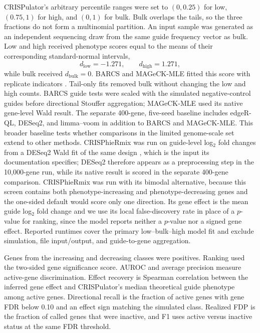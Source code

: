 CRISPulator's arbitrary percentile ranges were set to $(0,0.25)$ for low,
$(0.75,1)$ for high, and $(0,1)$ for bulk.  Bulk overlaps the tails, so the
three fractions do not form a multinomial partition.  An input sample was
generated as an independent sequencing draw from the same guide frequency
vector as bulk.  Low and high received phenotype scores equal to the means of
their corresponding standard-normal intervals, \[
d_{\mathrm{low}}=-1.271,\qquad  d_{\mathrm{high}}=1.271, \] while bulk
received $d_{\mathrm{bulk}}=0$.  BARCS and MAGeCK-MLE fitted this score with
replicate indicators \citep{li2015mageckvispr}. Tail-only fits removed bulk
without changing the low and high counts.  BARCS guide tests were scaled with
the simulated negative-control guides before directional Stouffer aggregation;
MAGeCK-MLE used its native gene-level Wald result.  The separate 400-gene,
five-seed baseline includes edgeR-QL, DESeq2, and limma--voom in addition to
BARCS and MAGeCK-MLE.  This broader baseline tests whether comparisons in the
limited genome-scale set extend to other methods. CRISPhieRmix
\citep{daley2018crisphiermix} was run on guide-level log$_2$ fold changes from
a DESeq2 Wald fit of the same design \citep{love2014deseq2}, which is the
input its documentation specifies; DESeq2 therefore appears as a preprocessing
step in the 10,000-gene run, while its native result is scored in the separate
400-gene comparison. CRISPhieRmix was run with its bimodal alternative,
because this screen contains both phenotype-increasing and
phenotype-decreasing genes and the one-sided default would score only one
direction.  Its gene effect is the mean guide log$_2$ fold change and we use
its local false-discovery rate in place of a $p$-value for ranking, since the
model reports neither a $p$-value nor a signed gene effect.  Reported runtimes
cover the primary low--bulk--high model fit and exclude simulation, file
input/output, and guide-to-gene aggregation.

Genes from the increasing and decreasing classes were positives.  Ranking used
the two-sided gene significance score.  AUROC and average precision measure
active-gene discrimination.  Effect recovery is Spearman correlation between
the inferred gene effect and CRISPulator's median theoretical guide phenotype
among active genes.  Directional recall is the fraction of active genes with
gene FDR below 0.10 and an effect sign matching the simulated class.  Realized
FDP is the fraction of called genes that were inactive, and F1 uses active
versus inactive status at the same FDR threshold.
